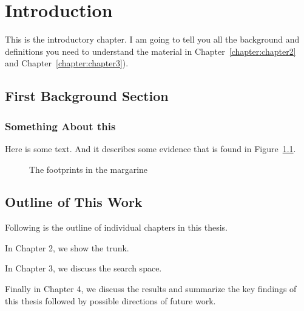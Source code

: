 \chapter{Introduction}

\label{chapter:introduction}

This is the introductory chapter. I am going to tell you all the background and definitions you need to understand the material in Chapter~\ref{chapter:chapter2} and Chapter~\ref{chapter:chapter3}).


\section{First Background Section }



\subsection{Something About this}

Here is some text. And it describes some evidence that is found in
Figure~\ref{elephantfig}.


\begin{figure}[htb!]
\begin{center}
   \caption{The footprints in the margarine}
   \label{elephantfig}
 \end{center}
\end{figure}


\section{Outline of This Work}

Following is the  outline  of individual chapters in this thesis.

In Chapter 2, we show the trunk.

In Chapter 3, we discuss the search space. 

Finally in Chapter 4, we discuss the results and summarize the key
findings of this thesis followed by possible directions of future
work.
